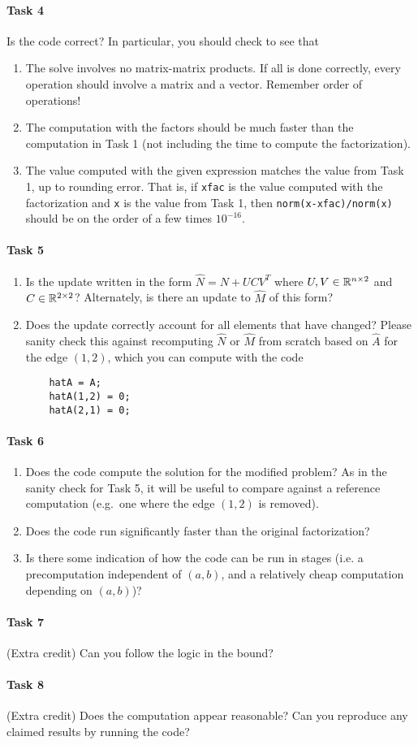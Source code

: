 \documentclass[12pt, leqno]{article}
\begin{document}
\paragraph*{Task 4}
Is the code correct?  In particular, you should check to see that
\begin{enumerate}
\item
  The solve involves no matrix-matrix products.  If all is done
  correctly, every operation should involve a matrix and a vector.
  Remember order of operations!
\item
  The computation with the factors should be much faster than the
  computation in Task 1 (not including the time to compute the
  factorization).
\item
  The value computed with the given expression matches the value from
  Task 1, up to rounding error.  That is, if {\tt xfac} is the value
  computed with the factorization and {\tt x} is the value from Task
  1, then {\tt norm(x-xfac)/norm(x)} should be on the order of a few
  times $10^{-16}$.
\end{enumerate}

\paragraph*{Task 5}
\begin{enumerate}
\item
  Is the update written in the form $\hat{N} = N + UCV^T$ where
  $U, V \in \mathbb{R}^{n \times 2}$ and $C \in \mathbb{R}^{2 \times 2}$?
  Alternately, is there an update to $\hat{M}$ of this form?
\item
  Does the update correctly account for all elements that have
  changed?  Please sanity check this against recomputing $\hat{N}$
  or $\hat{M}$ from scratch based on $\hat{A}$ for the edge $(1,2)$,
  which you can compute with the code
  \begin{lstlisting}
    hatA = A;
    hatA(1,2) = 0;
    hatA(2,1) = 0;
  \end{lstlisting}
\end{enumerate}

\paragraph*{Task 6}
\begin{enumerate}
\item
  Does the code compute the solution for the modified problem?  As in
  the sanity check for Task 5, it will be useful to compare against
  a reference computation (e.g.~one where the edge $(1,2)$ is
  removed).
\item
  Does the code run significantly faster than the original
  factorization?
\item
  Is there some indication of how the code can be run in stages
  (i.e. a precomputation independent of $(a,b)$, and a relatively
  cheap computation depending on $(a,b)$)?
\end{enumerate}

\paragraph*{Task 7} (Extra credit)
Can you follow the logic in the bound?

\paragraph*{Task 8} (Extra credit)
Does the computation appear reasonable?  Can you reproduce any claimed
results by running the code?
\end{document}
